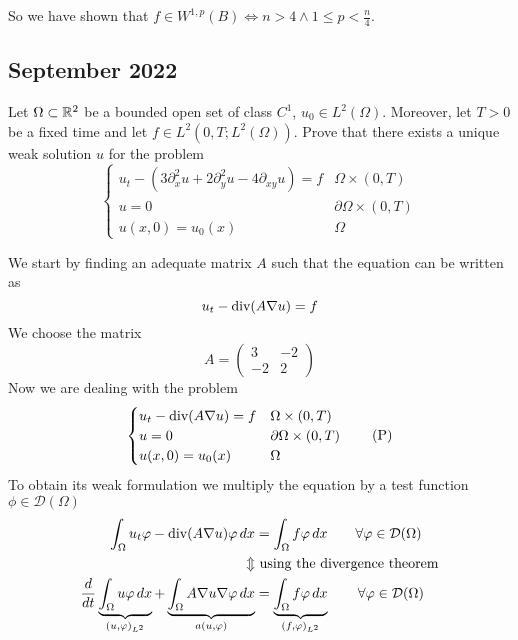 So we have shown that \(f \in W^{1, p}(B) \iff n > 4 \land 1 \leq p < \frac{n}{4}\).

\newpage
\subsection{September 2022}
\begin{exercise}
    Let \(\Omega \subset \mathbb{R}^2\) be a bounded open set of class \(C^1\), \(u_0 \in L^2(\Omega)\). Moreover, let \(T > 0\) be a fixed time and let \(f \in L^2(0, T; L^2(\Omega))\). Prove that there exists a unique weak solution \(u\) for the problem
    \[
        \begin{cases}
            u_t - \left( 3\partial_{x}^2 u + 2\partial_{y}^2 u - 4 \partial_{xy} u \right) = f & \Omega \times (0, T) \\
            u = 0 & \partial\Omega \times (0, T) \\
            u(x, 0) = u_0(x) & \Omega
        \end{cases}
    \]
\end{exercise}
We start by finding an adequate matrix \(A\) such that the equation can be written as
\[
    u_t - \text{div}(A \nabla u) = f
\]
We choose the matrix
\[
    A = \begin{pmatrix}
        3 & -2 \\
        -2 & 2
    \end{pmatrix}
\]
Now we are dealing with the problem
\[
    \begin{cases}
        u_t - \text{div}(A \nabla u) = f & \Omega \times (0, T) \\
        u = 0 & \partial\Omega \times (0, T) \\
        u(x, 0) = u_0(x) & \Omega
    \end{cases}
    \tag*{(P)}
\]
To obtain its weak formulation we multiply the equation by a test function \(\phi \in \mathcal{D}(\Omega)\) 
\begin{align*}
    \int_\Omega u_t \varphi - \text{div}(A \nabla u) \varphi \, dx &= \int_\Omega f \varphi \, dx \qquad \forall \varphi \in \mathcal{D}(\Omega) \\
    \Updownarrow &\text{ using the divergence theorem} \\
    \frac{d}{dt} \underbrace{\int_\Omega u \varphi \, dx}_{(u, \varphi)_{L^2}} + \underbrace{\int_\Omega A \nabla u \nabla \varphi \, dx}_{a(u,\varphi)} &= \underbrace{\int_\Omega f \varphi \, dx}_{(f, \varphi)_{L^2}} \qquad \forall \varphi \in \mathcal{D}(\Omega) \\
\end{align*}
